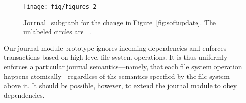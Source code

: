 \begin{comment}
Almost all of this description of journaling translates directly into \patch\
dependencies. The incoming \patches\ must be rearranged to implement the new
structure, but for the most part this transformation is straightforward. There
are two special considerations which the journal \module\ must address, however.

First, with soft updates, \patches\ can always be written to the disk when
flushing the cache, while the journal must be able to ``lock'' \patches\ into
the cache while transactions are in progress. To accomplish this, the journal
\module\ uses a managed \noop\ \patch, as outlined in
Section~\ref{sec:patch:noop}.

Second, the commit record is created at the end of the transaction, but the file
system changes created during the transaction must be made to depend on it.
Ordinarily this is not permitted (see \S\ref{sec:patch:nrb}). The condition for
violating this rule is a static proof that no cycle can result from doing so
(immediately or in the future); we have determined this to be the case for the
journal \module\ by hand.
\end{comment}

\begin{figure}
  \centering
  \texttt{[image: fig/figures\_2]}
  \caption{\label{fig:journal} Journal \patch\ subgraph for the
    change in Figure~\ref{fig:softupdate}. The unlabeled circles are
    \noop\ \patches.}
\end{figure}

\begin{comment}
Figure~\ref{fig:journal} shows the \patch\ configuration which is created
by applying the journal transformation to the \patches\ in
Figure~\ref{fig:softupdate}. The original four \patches\ have been
modified to depend on a journal commit record (via \anoop\ \patch), and
no longer have explicit dependencies on each other. The commit record
depends on journal blocks containing copies of the changes. Finally, the
commit record can be marked as completed once the original four \patches\
have been written. This transformation is performed incrementally as
\patches\ arrive. 
\end{comment}

\begin{comment}
Due to this design, the journal \module\ is completely independent of any
specific file system. It is a block device \module\ that automatically journals
whatever file system is stored on it. In fact, the incoming \patches\ need not
be arranged for soft updates, or for that matter in any particular configuration
at all.
\end{comment}


Our journal module prototype ignores incoming dependencies
and enforces transactions based on high-level file system operations.
%
It is thus uniformly enforces a particular journal semantics---namely, that
each file system operation happens atomically---regardless of the semantics
specified by the file system above it.
%
It should be possible, however, to extend the journal module to obey
dependencies.
